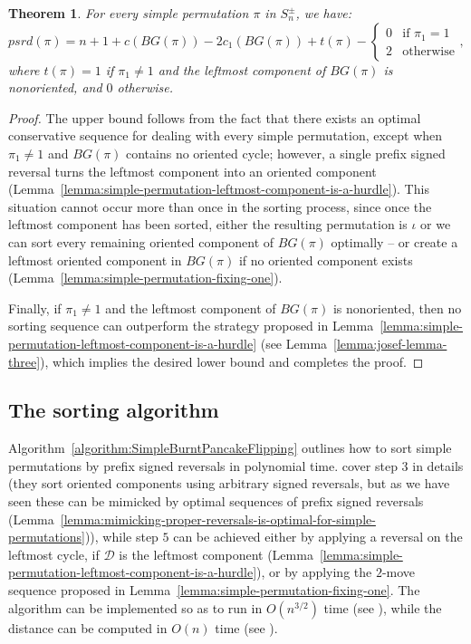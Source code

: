 \documentclass[review]{elsarticle}
\newtheorem{theorem}{Theorem}
\begin{document}
\begin{theorem}\label{thm:formula-for-psrd-of-simple-permutations}
For every simple permutation $\pi$ in $S^{\pm}_n$, we have:
$$psrd(\pi)
=
n+1+c(BG(\pi))-2c_1(BG(\pi))+t(\pi)-\left\{
\begin{array}{ll}
0 & \mbox{if } \pi_1= 1 \\
2 & \mbox{otherwise}
\end{array}
\right.,
$$
where $t(\pi)=1$ if $\pi_1\neq 1$ and the leftmost component of $BG(\pi)$ is nonoriented, and $0$ otherwise.
\end{theorem}
\begin{proof}
The upper bound follows from the fact that there exists an optimal conservative sequence for dealing with every simple permutation, except when $\pi_1\neq 1$ and $BG(\pi)$ contains no oriented cycle; however, a single prefix signed reversal turns the leftmost component into an oriented component (Lemma~\ref{lemma:simple-permutation-leftmost-component-is-a-hurdle}). 
This situation cannot occur more than once in the sorting process, since once the leftmost component has been sorted, either the resulting permutation is $\iota$ or we can sort every remaining oriented component of $BG(\pi)$ optimally -- or create a leftmost oriented component in $BG(\pi)$ if no oriented component exists (Lemma~\ref{lemma:simple-permutation-fixing-one}).

Finally, if $\pi_1\neq 1$ and the leftmost component of $BG(\pi)$ is nonoriented, then no sorting sequence can outperform the strategy proposed in Lemma~\ref{lemma:simple-permutation-leftmost-component-is-a-hurdle} (see Lemma~\ref{lemma:josef-lemma-three}), which implies the desired lower bound and completes the proof.
\end{proof}

\subsection{The sorting algorithm}

Algorithm~\ref{algorithm:SimpleBurntPancakeFlipping} outlines how to sort simple permutations by prefix signed reversals in polynomial time. \citet{tannier-advances} cover step $3$ in details (they sort oriented components using arbitrary signed reversals, but as we have seen these can be mimicked by optimal sequences of prefix signed reversals (Lemma~\ref{lemma:mimicking-proper-reversals-is-optimal-for-simple-permutations})), while step $5$ can be achieved either by applying a reversal on the leftmost cycle, if $\mathcal D$ is the leftmost component (Lemma~\ref{lemma:simple-permutation-leftmost-component-is-a-hurdle}), or by applying the $2$-move sequence proposed in Lemma~\ref{lemma:simple-permutation-fixing-one}. The algorithm can be implemented so as to run in $O(n^{3/2})$ time (see \citet{tannier-advances,han-improving}), while the distance can be computed in $O(n)$ time (see \citet{bader-linear}).
\end{document}
